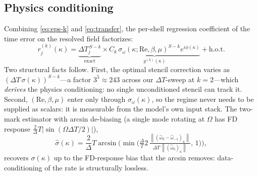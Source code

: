 \documentclass[11pt]{article}
\theoremstyle{plain}
\theoremstyle{definition}
\newcommand{\DT}{\Delta T}
\newcommand{\norm}[1]{\left\lVert #1 \right\rVert}
\newcommand{\shat}{\hat{\sigma}}
\begin{document}
\subsection{Physics conditioning}
\label{sec:conditioning}
Combining \eqref{eq:eps-k} and \eqref{eq:transfer}, the per-shell
regression coefficient of the time error on the resolved field factorizes:
\begin{equation}
r^{(k)}_j(\kappa)
=\underbrace{\DT_j^{\,S-k}}_{\text{exact}}\times
\underbrace{C_k\,\sigma_\omega(\kappa;\mathrm{Re},\beta,\mu)^{S-k}
e^{i\phi(\kappa)}}_{g^{(k)}(\kappa)}+\text{h.o.t.}
\label{eq:factorization}
\end{equation}
Two structural facts follow. First, the optimal stencil correction varies as
$(\DT\,\sigma(\kappa))^{S-k}$---a factor $3^5\approx243$ across our
$\DT$-sweep at $k=2$---which \emph{derives} the physics conditioning: no
single unconditioned stencil can track it. Second,
$(\mathrm{Re},\beta,\mu)$ enter only through $\sigma_\omega(\kappa)$, so the
regime never needs to be supplied as scalars: it is measurable from the
model's own input stack. The two-mark estimator with arcsin de-biasing (a
single mode rotating at $\Omega$ has FD response
$\tfrac2\DT|\sin(\Omega\DT/2)|$),
\begin{equation}
\shat(\kappa)=\frac2\DT\arcsin\!\Big(\min\big(
\tfrac\DT2\,\tfrac{\norm{(\hat\omega_0-\hat\omega_{-1})_\kappa}}
{\DT\,\norm{(\hat\omega_0)_\kappa}},\,1\big)\Big),
\label{eq:sigmahat}
\end{equation}
recovers $\sigma(\kappa)$ up to the FD-response bias that the arcsin
removes: data-conditioning of the rate is structurally lossless.
\end{document}
